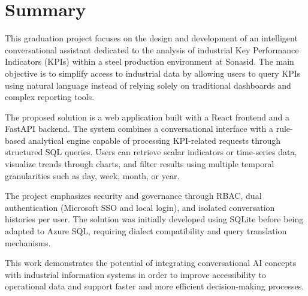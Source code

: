 \chapter*{Summary}
This graduation project focuses on the design and development of an intelligent conversational assistant dedicated to the analysis of industrial Key Performance Indicators (KPIs) within a steel production environment at Sonasid. The main objective is to simplify access to industrial data by allowing users to query KPIs using natural language instead of relying solely on traditional dashboards and complex reporting tools.

The proposed solution is a web application built with a React frontend and a FastAPI backend. The system combines a conversational interface with a rule-based analytical engine capable of processing KPI-related requests through structured SQL queries. Users can retrieve scalar indicators or time-series data, visualize trends through charts, and filter results using multiple temporal granularities such as day, week, month, or year.

The project emphasizes security and governance through RBAC, dual authentication (Microsoft SSO and local login), and isolated conversation histories per user. The solution was initially developed using SQLite before being adapted to Azure SQL, requiring dialect compatibility and query translation mechanisms.

This work demonstrates the potential of integrating conversational AI concepts with industrial information systems in order to improve accessibility to operational data and support faster and more efficient decision-making processes.
